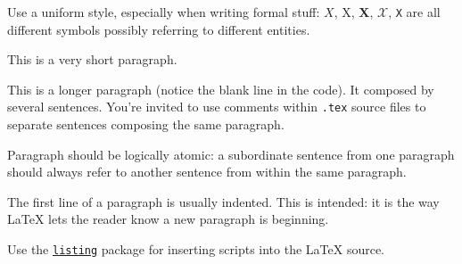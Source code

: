 \documentclass{scrartcl}
\begin{document}
Use a uniform style, especially when writing formal stuff: $X$, X, $\mathbf{X}$, $\mathcal{X}$, \texttt{X} are all different symbols possibly referring to different entities. 

This is a very short paragraph.

This is a longer paragraph (notice the blank line in the code).
It composed by several sentences.
%
You're invited to use comments within \texttt{.tex} source files to separate sentences composing the same paragraph.

Paragraph should be logically atomic: a subordinate sentence from one paragraph should always refer to another sentence from within the same paragraph.

The first line of a paragraph is usually indented.
%
This is intended: it is the way \LaTeX{} lets the reader know a new paragraph is beginning.

Use the \href{https://en.wikibooks.org/wiki/LaTeX/Source_Code_Listings}{\texttt{listing}} package for inserting scripts into the \LaTeX{} source.

% 
% 


\end{document}
